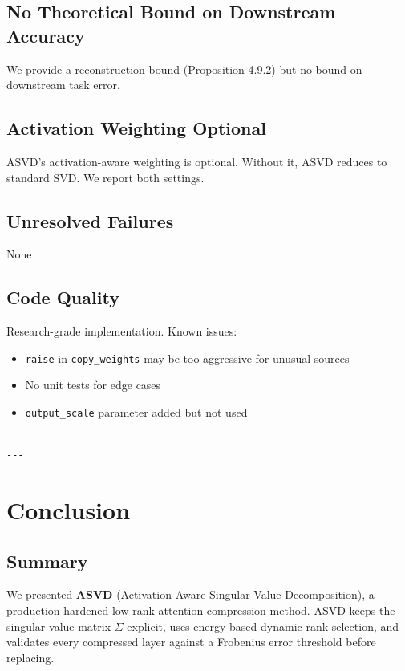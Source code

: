 \subsection{No Theoretical Bound on Downstream Accuracy}

We provide a reconstruction bound (Proposition 4.9.2) but no bound on 
downstream task error.

\subsection{Activation Weighting Optional}

ASVD's activation-aware weighting is optional. Without it, ASVD reduces 
to standard SVD. We report both settings.

\subsection{Unresolved Failures}

None

\subsection{Code Quality}

Research-grade implementation. Known issues:
\begin{itemize}
\item \texttt{raise} in \texttt{copy\_weights} may be too aggressive for unusual sources
\item No unit tests for edge cases
\item \texttt{output\_scale} parameter added but not used
\end{itemize}
\begin{lstlisting}

---
\end{lstlisting}


\section{Conclusion}

\subsection{Summary}

We presented \textbf{ASVD} (Activation-Aware Singular Value Decomposition), a 
production-hardened low-rank attention compression method. ASVD keeps the 
singular value matrix $\Sigma$ explicit, uses energy-based dynamic rank 
selection, and validates every compressed layer against a Frobenius error 
threshold before replacing.


